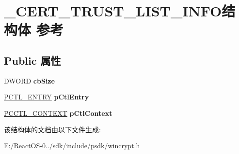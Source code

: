 \hypertarget{struct___c_e_r_t___t_r_u_s_t___l_i_s_t___i_n_f_o}{}\section{\+\_\+\+C\+E\+R\+T\+\_\+\+T\+R\+U\+S\+T\+\_\+\+L\+I\+S\+T\+\_\+\+I\+N\+F\+O结构体 参考}
\label{struct___c_e_r_t___t_r_u_s_t___l_i_s_t___i_n_f_o}
\subsection*{Public 属性}
\begin{DoxyCompactItemize}
\item 
\mbox{\label{struct___c_e_r_t___t_r_u_s_t___l_i_s_t___i_n_f_o_a960812b2cd570875aa2b992a68ba26ee}} 
D\+W\+O\+RD {\bfseries cb\+Size}
\item 
\mbox{\label{struct___c_e_r_t___t_r_u_s_t___l_i_s_t___i_n_f_o_a9796ffc61ca581dbd37d3ae60ad13e46}} 
\hyperlink{struct___c_t_l___e_n_t_r_y}{P\+C\+T\+L\+\_\+\+E\+N\+T\+RY} {\bfseries p\+Ctl\+Entry}
\item 
\mbox{\label{struct___c_e_r_t___t_r_u_s_t___l_i_s_t___i_n_f_o_a50f1bce96dbf93334c6baefb7c12e125}} 
\hyperlink{struct___c_t_l___c_o_n_t_e_x_t}{P\+C\+C\+T\+L\+\_\+\+C\+O\+N\+T\+E\+XT} {\bfseries p\+Ctl\+Context}
\end{DoxyCompactItemize}


该结构体的文档由以下文件生成\+:\begin{DoxyCompactItemize}
\item 
E\+:/\+React\+O\+S-\/0../sdk/include/psdk/wincrypt.\+h\end{DoxyCompactItemize}
